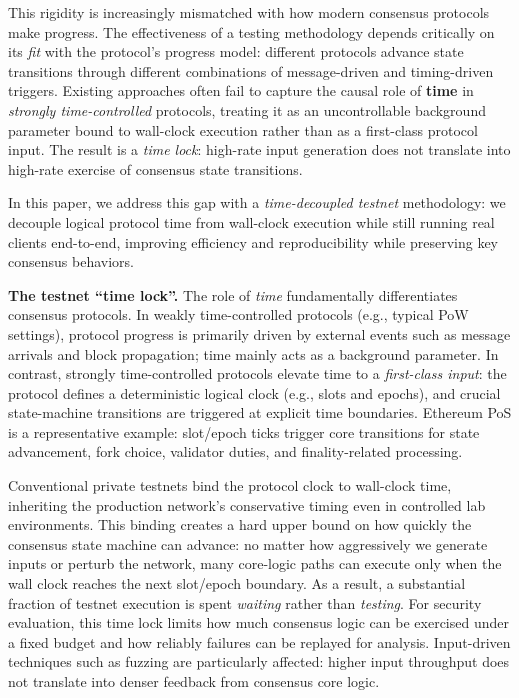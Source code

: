 This rigidity is increasingly mismatched with how modern consensus protocols make progress. The effectiveness of a testing methodology depends critically on its \emph{fit} with the protocol's progress model: different protocols advance state transitions through different combinations of message-driven and timing-driven triggers. Existing approaches often fail to capture the causal role of \textbf{time} in \emph{strongly time-controlled} protocols, treating it as an uncontrollable background parameter bound to wall-clock execution rather than as a first-class protocol input. The result is a \emph{time lock}: high-rate input generation does not translate into high-rate exercise of consensus state transitions.

In this paper, we address this gap with a \emph{time-decoupled testnet} methodology: we decouple logical protocol time from wall-clock execution while still running real clients end-to-end, improving efficiency and reproducibility while preserving key consensus behaviors.

\smallskip
\noindent\textbf{The testnet ``time lock''.}
The role of \emph{time} fundamentally differentiates consensus protocols. In weakly time-controlled protocols (e.g., typical PoW settings), protocol progress is primarily driven by external events such as message arrivals and block propagation; time mainly acts as a background parameter. In contrast, strongly time-controlled protocols elevate time to a \emph{first-class input}: the protocol defines a deterministic logical clock (e.g., slots and epochs), and crucial state-machine transitions are triggered at explicit time boundaries. Ethereum PoS is a representative example: slot/epoch ticks trigger core transitions for state advancement, fork choice, validator duties, and finality-related processing.

Conventional private testnets bind the protocol clock to wall-clock time, inheriting the production network's conservative timing even in controlled lab environments. This binding creates a hard upper bound on how quickly the consensus state machine can advance: no matter how aggressively we generate inputs or perturb the network, many core-logic paths can execute only when the wall clock reaches the next slot/epoch boundary. As a result, a substantial fraction of testnet execution is spent \emph{waiting} rather than \emph{testing}. For security evaluation, this time lock limits how much consensus logic can be exercised under a fixed budget and how reliably failures can be replayed for analysis. Input-driven techniques such as fuzzing are particularly affected: higher input throughput does not translate into denser feedback from consensus core logic.

